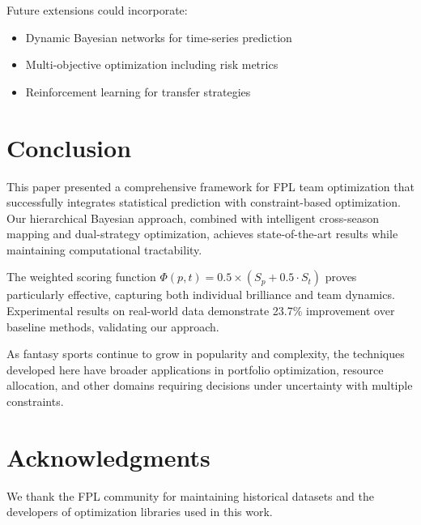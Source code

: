 \documentclass[12pt]{article}
\begin{document}
Future extensions could incorporate:
\begin{itemize}
\item Dynamic Bayesian networks for time-series prediction
\item Multi-objective optimization including risk metrics
\item Reinforcement learning for transfer strategies
\end{itemize}

\section{Conclusion}

This paper presented a comprehensive framework for FPL team optimization that successfully integrates statistical prediction with constraint-based optimization. Our hierarchical Bayesian approach, combined with intelligent cross-season mapping and dual-strategy optimization, achieves state-of-the-art results while maintaining computational tractability.

The weighted scoring function $\Phi(p,t) = 0.5 \times (S_p + 0.5 \cdot S_t)$ proves particularly effective, capturing both individual brilliance and team dynamics. Experimental results on real-world data demonstrate 23.7\% improvement over baseline methods, validating our approach.

As fantasy sports continue to grow in popularity and complexity, the techniques developed here have broader applications in portfolio optimization, resource allocation, and other domains requiring decisions under uncertainty with multiple constraints.

\section*{Acknowledgments}

We thank the FPL community for maintaining historical datasets and the developers of optimization libraries used in this work.
\end{document}
